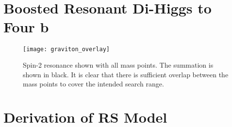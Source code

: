\documentclass[12pt]{article}
\begin{document}
\clearpage
\section{Boosted Resonant Di-Higgs to Four b}
\begin{figure}[h]
    \centering
    \texttt{[image: graviton\_overlay]}
    \caption{Spin-2 resonance shown with all mass points. The summation is shown
    in black. It is clear that there is sufficient overlap between the mass
    points to cover the intended search range.}
    \label{fig:graviton_overlay}
\end{figure}

\clearpage
\newpage
\section{Derivation of RS Model}
\end{document}
